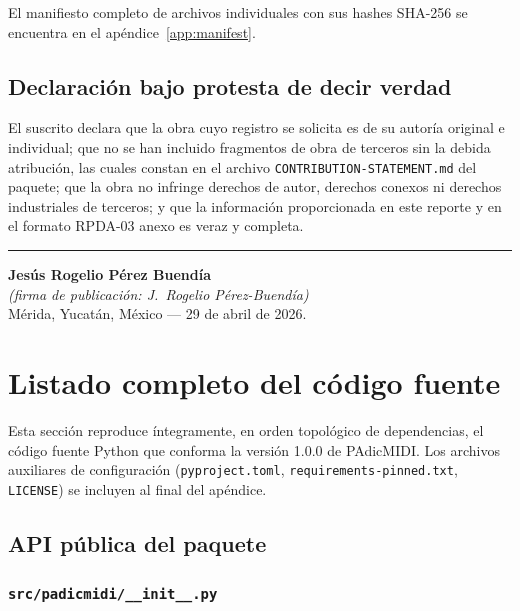 \documentclass[11pt,a4paper,oneside]{article}
\theoremstyle{plain}
\theoremstyle{definition}
\theoremstyle{remark}
\newcommand{\code}[1]{\texttt{\small #1}}
\begin{document}
\medskip

El manifiesto completo de archivos individuales con sus hashes SHA-256
se encuentra en el apéndice~\ref{app:manifest}.

\subsection{Declaración bajo protesta de decir verdad}

El suscrito declara que la obra cuyo registro se solicita es de su
autoría original e individual; que no se han incluido fragmentos de
obra de terceros sin la debida atribución, las cuales constan en el
archivo \code{CONTRIBUTION-STATEMENT.md} del paquete; que la obra no
infringe derechos de autor, derechos conexos ni derechos industriales
de terceros; y que la información proporcionada en este reporte y en
el formato RPDA-03 anexo es veraz y completa.

\bigskip
\bigskip
\bigskip

\noindent
\rule{6cm}{0.4pt}

\textbf{Jesús Rogelio Pérez Buendía}\\
{\itshape (firma de publicación: J.~Rogelio Pérez-Buendía)}\\
Mérida, Yucatán, México --- 29 de abril de 2026.

\newpage

\appendix

\section{Listado completo del código fuente}\label{app:source}

Esta sección reproduce íntegramente, en orden topológico de
dependencias, el código fuente Python que conforma la versión 1.0.0 de
PAdicMIDI. Los archivos auxiliares de configuración
(\code{pyproject.toml}, \code{requirements-pinned.txt},
\code{LICENSE}) se incluyen al final del apéndice.

\subsection{API pública del paquete}

\subsubsection{\code{src/padicmidi/\_\_init\_\_.py}}

\end{document}
